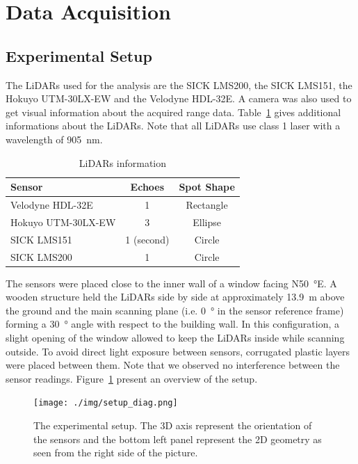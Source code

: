 \section{Data Acquisition}

\subsection{Experimental Setup}
The LiDARs used for the analysis are the SICK LMS200, the SICK LMS151, the Hokuyo UTM-30LX-EW and the Velodyne HDL-32E. A camera was also used to get visual information about the acquired range data. Table~\ref{tab:lidars} gives additional informations about the LiDARs. Note that all LiDARs use class 1 laser with a wavelength of \SI{905}{\nano\meter}.

\begin{table}[htbp]
    \centering
    \begin{tabularx}{\linewidth}{|X||c|c|}\hline
        Sensor              & Echoes     & Spot Shape \\ \hline%
        Velodyne HDL-32E    & 1          & Rectangle  \\ \hline
        Hokuyo UTM-30LX-EW  & 3          & Ellipse    \\ \hline
        SICK LMS151         & 1 (second) & Circle     \\ \hline
        SICK LMS200         & 1          & Circle     \\ \hline
    \end{tabularx}
    \caption{LiDARs information}\label{tab:lidars}
\end{table}


The sensors were placed close to the inner wall of a window facing N\SI{50}{\degree}E. A wooden structure held the LiDARs side by side at approximately \SI{13.9}{\meter} above the ground and the main scanning plane (i.e. \SI{0}{\degree} in the sensor reference frame) forming a \SI{30}{\degree} angle with respect to the building wall. In this configuration, a slight opening of the window allowed to keep the LiDARs inside while scanning outside. To avoid direct light exposure between sensors, corrugated plastic layers were placed between them. Note that we observed no interference between the sensor readings. Figure~\ref{fig:setup} present an overview of the setup.

\begin{figure}[h]
    \centering
    \texttt{[image: ./img/setup\_diag.png]}
    \caption{The experimental setup. The 3D axis represent the orientation of the sensors and the bottom left panel represent the 2D geometry as seen from the right side of the picture.}
    \label{fig:setup}
\end{figure}

